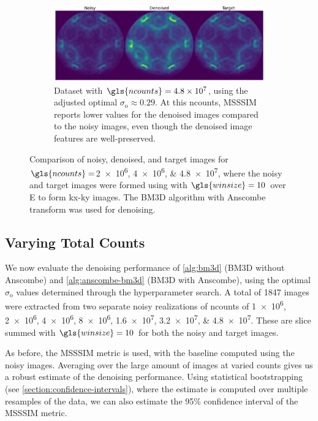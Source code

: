 \begin{figure}
    \begin{subfigure}[b]{1\linewidth}
        \centering
        \includegraphics[width=1\linewidth]{images/noisy_denoised_ref_48M_avg_bm3d.pdf}
        \caption{Dataset with $\gls{ncounts}=\num{4.8e7}$, using the adjusted optimal $\sigma_{\text{o}}\approx0.29$. At this \gls{ncounts}, \gls{MSSSIM} reports lower values for the denoised images compared to the noisy images, even though the denoised image features are well-preserved.}
        \label{fig:noisy-denoised-ref-48M-avg-bm3d}
    \end{subfigure}

    \caption{Comparison of noisy, denoised, and target images for $\gls{ncounts}=$\numlist{2e6;4e6;4.8e7}, where the noisy and target images were formed using with $\gls{winsize}=\num{10}$ over \gls{E} to form \gls{kx}-\gls{ky} images. The \gls{BM3D} algorithm with Anscombe transform was used for denoising.}
    \label{fig:combined-noisy-denoised}
\end{figure}

\subsection{Varying Total Counts}
We now evaluate the denoising performance of \cref{alg:bm3d} (\gls{BM3D} without Anscombe) and \cref{alg:anscombe-bm3d} (\gls{BM3D} with Anscombe), using the optimal $\sigma_{\text{o}}$ values determined through the hyperparameter search. A total of \num{1847} images  were extracted from two separate noisy realizations of \gls{ncounts} of \numlist{1e6;2e6;4e6;8e6;1.6e7;3.2e7;4.8e7}. These are slice summed with $\gls{winsize}=10$ for both the noisy and target images. 

As before, the \gls{MSSSIM} metric is used, with the baseline computed using the noisy images. Averaging over the large amount of images at varied counts gives us a robust estimate of the denoising performance. Using statistical bootstrapping (see \cref{section:confidence-intervals}), where the estimate is computed over multiple resamples of the data, we can also estimate the \num{95}\% confidence interval of the \gls{MSSSIM} metric.

